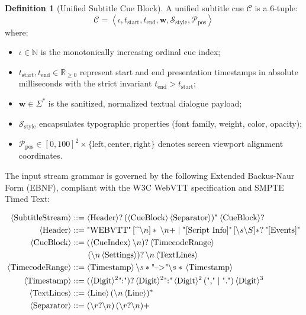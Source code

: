 \documentclass[11pt,a4paper,reqno]{article}
\theoremstyle{definition}
\newtheorem{definition}[theorem]{Definition}
\theoremstyle{remark}
\begin{document}
\begin{definition}[Unified Subtitle Cue Block]
A unified subtitle cue $\mathcal{C}$ is a 6-tuple:
\begin{equation}
\mathcal{C} = \left\langle \iota, t_{\text{start}}, t_{\text{end}}, \mathbf{w}, \mathcal{S}_{\text{style}}, \mathcal{P}_{\text{pos}} \right\rangle
\end{equation}
where:
\begin{itemize}
    \item $\iota \in \mathbb{N}$ is the monotonically increasing ordinal cue index;
    \item $t_{\text{start}}, t_{\text{end}} \in \mathbb{R}_{\ge 0}$ represent start and end presentation timestamps in absolute milliseconds with the strict invariant $t_{\text{end}} > t_{\text{start}}$;
    \item $\mathbf{w} \in \Sigma^*$ is the sanitized, normalized textual dialogue payload;
    \item $\mathcal{S}_{\text{style}}$ encapsulates typographic properties (font family, weight, color, opacity);
    \item $\mathcal{P}_{\text{pos}} \in [0, 100]^2 \times \{\text{left}, \text{center}, \text{right}\}$ denotes screen viewport alignment coordinates.
\end{itemize}
\end{definition}

The input stream grammar is governed by the following Extended Backus-Naur Form (EBNF), compliant with the W3C WebVTT specification \cite{w3c_webvtt} and SMPTE Timed Text:

\begin{align}
\langle \text{SubtitleStream} \rangle &::= \langle \text{Header} \rangle? \, (\langle \text{CueBlock} \rangle \, \langle \text{Separator} \rangle)^* \, \langle \text{CueBlock} \rangle? \notag \\
\langle \text{Header} \rangle &::= \text{"WEBVTT"} \, [\text{\textasciicircum}\backslash n]* \, \backslash n+ \mid \text{"[Script Info]"} \, [\backslash s\backslash S]*? \, \text{"[Events]"} \notag \\
\langle \text{CueBlock} \rangle &::= (\langle \text{CueIndex} \rangle \, \backslash n)? \, \langle \text{TimecodeRange} \rangle \notag \\
&\qquad (\backslash n \, \langle \text{Settings} \rangle)? \, \backslash n \, \langle \text{TextLines} \rangle \notag \\
\langle \text{TimecodeRange} \rangle &::= \langle \text{Timestamp} \rangle \, \backslash s* \text{"-->"} \backslash s* \, \langle \text{Timestamp} \rangle \notag \\
\langle \text{Timestamp} \rangle &::= (\langle \text{Digit}\rangle^2 \text{":"})? \, \langle \text{Digit}\rangle^2 \text{":"} \, \langle \text{Digit}\rangle^2 \, (\text{","} \mid \text{"."}) \, \langle \text{Digit}\rangle^3 \notag \\
\langle \text{TextLines} \rangle &::= \langle \text{Line} \rangle \, (\backslash n \, \langle \text{Line} \rangle)^* \notag \\
\langle \text{Separator} \rangle &::= (\backslash r? \backslash n) \, (\backslash r? \backslash n)+
\end{align}
\end{document}
